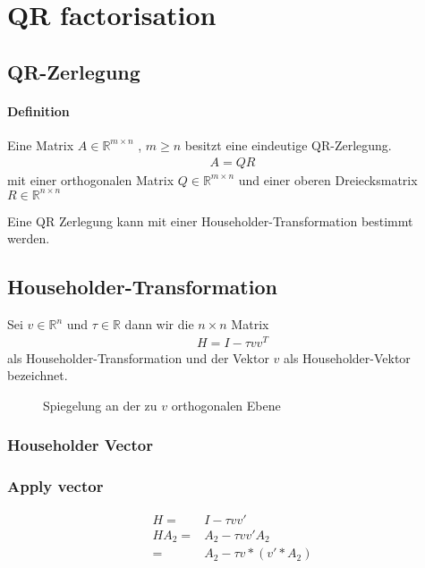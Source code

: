 \chapter{QR factorisation}

\section{QR-Zerlegung}
\subsubsection{Definition}
Eine Matrix $A \in \mathbb{R}^{m \times n}$ , $m \ge n$ besitzt eine eindeutige QR-Zerlegung.
\begin{align}
	A = QR
\end{align}
mit einer orthogonalen Matrix $ Q \in \mathbb{R}^{m \times n} $ und einer oberen Dreiecksmatrix $ R \in \mathbb{R}^{n \times n}$ 


Eine QR Zerlegung kann mit einer Householder-Transformation bestimmt werden.

\section{Householder-Transformation}
Sei $v \in \mathbb{R}^n$ und $\tau \in \mathbb{R}$ dann wir die $n \times n$ Matrix 
\begin{align}
	H = I - \tau v v^T
\end{align}
als Householder-Transformation und der Vektor $v$ als Householder-Vektor bezeichnet.
\begin{figure} 
	\centering
	
	\caption{Spiegelung an der zu $v$ orthogonalen Ebene }
	\label{fig:HHolder}
\end{figure}
\subsection{Householder Vector}
\subsection{Apply vector}
\begin{align}
H =& I - \tau vv'\\ 
H A_2 =& A_2 - \tau vv' A_2\\
=& A_2 - \tau v*(v'*A_2)
\end{align}

